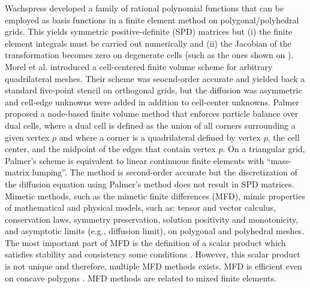 Wachspress \cite{Wachspress} developed a family of rational polynomial functions that can be employed
as basis functions in a finite element method on polygonal/polyhedral grids. This yields
symmetric positive-definite (SPD) matrices but (i) the finite element integrals must be carried out 
numerically and (ii) the Jacobian of the transformation becomes zero on degenerate cells 
(such as the ones shown on ). 
%
Morel et al. \cite{MorelDendyHallWhite1992} introduced a cell-centered finite volume scheme 
for arbitrary quadrilateral meshes. Their scheme was seocnd-order accurate and yielded back a 
standard five-point stencil on orthogonal grids, but the diffusion was asymmetric and cell-edge unknowns
were added in addition to cell-center unknowns.
%
Palmer \cite{PalmerLLNL,Palmer2005} proposed a node-based finite volume method 
that enforces particle balance over dual cells, where a dual cell is defined as 
the union of all corners surrounding a given vertex $p$ and where  a corner 
is a quadrilateral defined by vertex $p$, the cell center, and the midpoint
of the edges that contain vertex $p$. On a triangular grid, Palmer's scheme is equivalent 
to linear continuous finite elements with ``mass-matrix lumping''. The method is 
second-order accurate but the discretization of the diffusion equation using Palmer's method 
does not result in SPD matrices.
%
Mimetic methods, such as the mimetic finite differences (MFD), mimic properties of
mathematical and physical models, such as: tensor and vector calculus,
conservation laws, symmetry preservation, solution positivity and
monotonicity, and asymptotic limits (e.g., diffusion limit), on polygonal and
polyhedral meshes. The most important part of MFD is the definition of a scalar
product which satisfies stability and consistency some conditions
\cite{Brezzi2005}. However, this scalar product is not unique and therefore,
multiple MFD methods exists. MFD is efficient even on concave polygons
\cite{Kuznetsov2004}. MFD methods are related to mixed finite elements.









